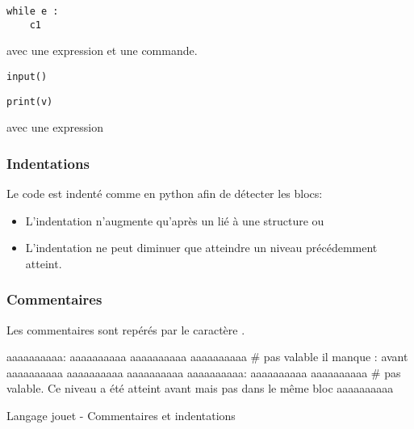 \begin{minipage}[c]{0.48\textwidth}
\begin{verbatim}
while e :
	c1
\end{verbatim}
\end{minipage}
\hfill
\begin{minipage}[c]{0.48\textwidth}
	avec  une expression et  une commande.	
\end{minipage}
\vspace{0.5cm}

\begin{minipage}[c]{0.48\textwidth}
\begin{verbatim}
input()
\end{verbatim}
\end{minipage}
\vspace{0.5cm}

\begin{minipage}[c]{0.48\textwidth}
\begin{verbatim}
print(v)
\end{verbatim}
\end{minipage}
\hfill
\begin{minipage}[c]{0.48\textwidth}
	avec  une expression	
\end{minipage}

\subsubsection{Indentations}
Le code est indenté comme en python afin de détecter les blocs:
\begin{itemize}
	\item L'indentation n'augmente qu'après un \pyinline{:} lié à une structure  ou 
	\item L'indentation ne peut diminuer que atteindre un niveau précédemment atteint.
\end{itemize}

\subsubsection{Commentaires}
Les commentaires sont repérés par le caractère \pyinline{#} .

\begin{lstfloat}
	\begin{center}
	\begin{pythonlst}
aaaaaaaaaa:
	aaaaaaaaaa
	aaaaaaaaaa
		aaaaaaaaaa # pas valable il manque : avant
		aaaaaaaaaa
	aaaaaaaaaa
aaaaaaaaaa
aaaaaaaaaa:
			aaaaaaaaaa
	aaaaaaaaaa # pas valable. Ce niveau a été atteint avant mais pas dans le même bloc
aaaaaaaaaa
\end{pythonlst}
\caption{Langage jouet - Commentaires et indentations}
\end{center}
\end{lstfloat}




